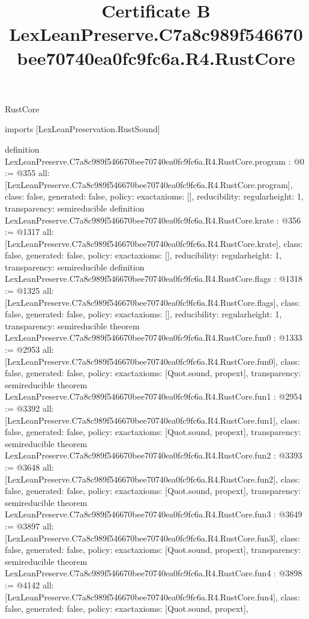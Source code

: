 \begin{lexlean}{RustCore}
\title{Certificate B LexLeanPreserve.C7a8c989f546670bee70740ea0fc9fc6a.R4.RustCore}
\begin{coremodule}
imports [LexLeanPreservation.RustSound]

definition LexLeanPreserve.C7a8c989f546670bee70740ea0fc9fc6a.R4.RustCore.program : @0 := @355 {
  all: [LexLeanPreserve.C7a8c989f546670bee70740ea0fc9fc6a.R4.RustCore.program],
  class: false,
  generated: false,
  policy: exact{axioms: []},
  reducibility: regular{height: 1},
  transparency: semireducible
}
definition LexLeanPreserve.C7a8c989f546670bee70740ea0fc9fc6a.R4.RustCore.krate : @356 := @1317 {
  all: [LexLeanPreserve.C7a8c989f546670bee70740ea0fc9fc6a.R4.RustCore.krate],
  class: false,
  generated: false,
  policy: exact{axioms: []},
  reducibility: regular{height: 1},
  transparency: semireducible
}
definition LexLeanPreserve.C7a8c989f546670bee70740ea0fc9fc6a.R4.RustCore.flags : @1318 := @1325 {
  all: [LexLeanPreserve.C7a8c989f546670bee70740ea0fc9fc6a.R4.RustCore.flags],
  class: false,
  generated: false,
  policy: exact{axioms: []},
  reducibility: regular{height: 1},
  transparency: semireducible
}
theorem LexLeanPreserve.C7a8c989f546670bee70740ea0fc9fc6a.R4.RustCore.fun0 : @1333 := @2953 {
  all: [LexLeanPreserve.C7a8c989f546670bee70740ea0fc9fc6a.R4.RustCore.fun0],
  class: false,
  generated: false,
  policy: exact{axioms: [Quot.sound, propext]},
  transparency: semireducible
}
theorem LexLeanPreserve.C7a8c989f546670bee70740ea0fc9fc6a.R4.RustCore.fun1 : @2954 := @3392 {
  all: [LexLeanPreserve.C7a8c989f546670bee70740ea0fc9fc6a.R4.RustCore.fun1],
  class: false,
  generated: false,
  policy: exact{axioms: [Quot.sound, propext]},
  transparency: semireducible
}
theorem LexLeanPreserve.C7a8c989f546670bee70740ea0fc9fc6a.R4.RustCore.fun2 : @3393 := @3648 {
  all: [LexLeanPreserve.C7a8c989f546670bee70740ea0fc9fc6a.R4.RustCore.fun2],
  class: false,
  generated: false,
  policy: exact{axioms: [Quot.sound, propext]},
  transparency: semireducible
}
theorem LexLeanPreserve.C7a8c989f546670bee70740ea0fc9fc6a.R4.RustCore.fun3 : @3649 := @3897 {
  all: [LexLeanPreserve.C7a8c989f546670bee70740ea0fc9fc6a.R4.RustCore.fun3],
  class: false,
  generated: false,
  policy: exact{axioms: [Quot.sound, propext]},
  transparency: semireducible
}
theorem LexLeanPreserve.C7a8c989f546670bee70740ea0fc9fc6a.R4.RustCore.fun4 : @3898 := @4142 {
  all: [LexLeanPreserve.C7a8c989f546670bee70740ea0fc9fc6a.R4.RustCore.fun4],
  class: false,
  generated: false,
  policy: exact{axioms: [Quot.sound, propext]},
}
\end{coremodule}
\end{lexlean}
